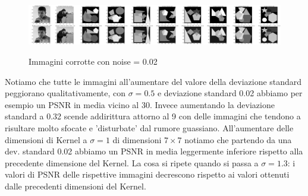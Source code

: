 \begin{figure}[H]
    \centering
    \begin{minipage}[h]{\textwidth}
        \centering
        \includegraphics[width=\linewidth]{output/tabCorrotte/imgcorr0.png}\label{fig:imgcorrotteGEN}
    \end{minipage}
    \begin{minipage}[h]{0.4\textwidth}
        \centering
    \end{minipage}
    \captionsetup{labelformat=andtable}
    \caption{Immagini corrotte con noise = 0.02}
\end{figure}
Notiamo che tutte le immagini all'aumentare del valore della deviazione standard peggiorano 
qualitativamente, con $\sigma = 0.5$ e deviazione standard 0.02 abbiamo per esempio un PSNR in 
media vicino al 30. Invece aumentando la deviazione standard a 0.32 scende addirittura attorno al 9 con delle 
immagini che tendono a risultare molto sfocate e 'disturbate' dal rumore guassiano. 
All'aumentare delle dimensioni di Kernel a $\sigma = 1$ di dimensioni $7 \times 7$ notiamo che partendo 
da una dev. standard 0.02 abbiamo un PSNR in media leggermente inferiore rispetto alla precedente dimensione 
del Kernel.
La cosa si ripete quando si passa a $\sigma = 1.3$: i valori di PSNR delle rispettive immagini decrescono 
rispetto ai valori ottenuti dalle precedenti dimensioni del Kernel.